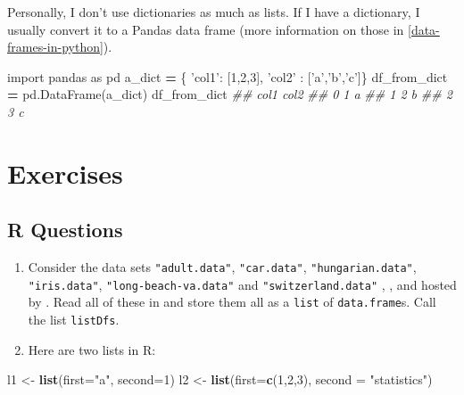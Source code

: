 \documentclass[12pt,krantz2]{krantz}
\makeatletter
\newenvironment{Shaded}{\begin{snugshade}}{\end{snugshade}}
\newcommand{\CommentTok}[1]{\textcolor[rgb]{0.37,0.37,0.37}{\textit{#1}}}
\newcommand{\DataTypeTok}[1]{\textcolor[rgb]{0.27,0.27,0.27}{#1}}
\newcommand{\DecValTok}[1]{\textcolor[rgb]{0.06,0.06,0.06}{#1}}
\newcommand{\ImportTok}[1]{#1}
\newcommand{\KeywordTok}[1]{\textcolor[rgb]{0.27,0.27,0.27}{\textbf{#1}}}
\newcommand{\NormalTok}[1]{#1}
\newcommand{\OperatorTok}[1]{\textcolor[rgb]{0.43,0.43,0.43}{\textbf{#1}}}
\newcommand{\StringTok}[1]{\textcolor[rgb]{0.5,0.5,0.5}{#1}}
\newenvironment{kframe}{%
\medskip{}
\setlength{\fboxsep}{.8em}
 \def\at@end@of@kframe{}%
 \ifinner\ifhmode%
  \def\at@end@of@kframe{\end{minipage}}%
  \begin{minipage}{\columnwidth}%
 \fi\fi%
 \def\FrameCommand##1{\hskip\@totalleftmargin \hskip-\fboxsep
 \colorbox{shadecolor}{##1}\hskip-\fboxsep
     \hskip-\linewidth \hskip-\@totalleftmargin \hskip\columnwidth}%
 \MakeFramed {\advance\hsize-\width
   \@totalleftmargin\z@ \linewidth\hsize
   \@setminipage}}%
 {\par\unskip\endMakeFramed%
 \at@end@of@kframe}
\renewenvironment{Shaded}{\begin{kframe}}{\end{kframe}}
\makeatother
\begin{document}
Personally, I don't use dictionaries as much as lists. If I have a dictionary, I usually convert it to a Pandas data frame (more information on those in \ref{data-frames-in-python}).

\begin{Shaded}
\begin{Highlighting}[]
\ImportTok{import}\NormalTok{ pandas }\ImportTok{as}\NormalTok{ pd}
\NormalTok{a_dict }\OperatorTok{=}\NormalTok{ \{ }\StringTok{'col1'}\NormalTok{: [}\DecValTok{1}\NormalTok{,}\DecValTok{2}\NormalTok{,}\DecValTok{3}\NormalTok{], }\StringTok{'col2'}\NormalTok{ : [}\StringTok{'a'}\NormalTok{,}\StringTok{'b'}\NormalTok{,}\StringTok{'c'}\NormalTok{]\}}
\NormalTok{df_from_dict }\OperatorTok{=}\NormalTok{ pd.DataFrame(a_dict)}
\NormalTok{df_from_dict}
\CommentTok{##    col1 col2}
\CommentTok{## 0     1    a}
\CommentTok{## 1     2    b}
\CommentTok{## 2     3    c}
\end{Highlighting}
\end{Shaded}

\hypertarget{exercises-3}{%
\section{Exercises}\label{exercises-3}}

\hypertarget{r-questions-3}{%
\subsection{R Questions}\label{r-questions-3}}

\begin{enumerate}
\def\labelenumi{\arabic{enumi}.}
\item
  Consider the data sets \texttt{"adult.data"}, \texttt{"car.data"}, \texttt{"hungarian.data"}, \texttt{"iris.data"}, \texttt{"long-beach-va.data"} and \texttt{"switzerland.data"} \citep{misc_heart_disease_45}, \citep{misc_iris_53}, \citep{misc_adult_2} and \citep{misc_car_evaluation_19} hosted by \citep{uci_data}. Read all of these in and store them all as a \texttt{list} of \texttt{data.frame}s. Call the list \texttt{listDfs}.
\item
  Here are two lists in R:
\end{enumerate}

\begin{Shaded}
\begin{Highlighting}[]
\NormalTok{l1 <-}\StringTok{ }\KeywordTok{list}\NormalTok{(}\DataTypeTok{first=}\StringTok{"a"}\NormalTok{, }\DataTypeTok{second=}\DecValTok{1}\NormalTok{)}
\NormalTok{l2 <-}\StringTok{ }\KeywordTok{list}\NormalTok{(}\DataTypeTok{first=}\KeywordTok{c}\NormalTok{(}\DecValTok{1}\NormalTok{,}\DecValTok{2}\NormalTok{,}\DecValTok{3}\NormalTok{), }\DataTypeTok{second =} \StringTok{"statistics"}\NormalTok{)}
\end{Highlighting}
\end{Shaded}
\end{document}
